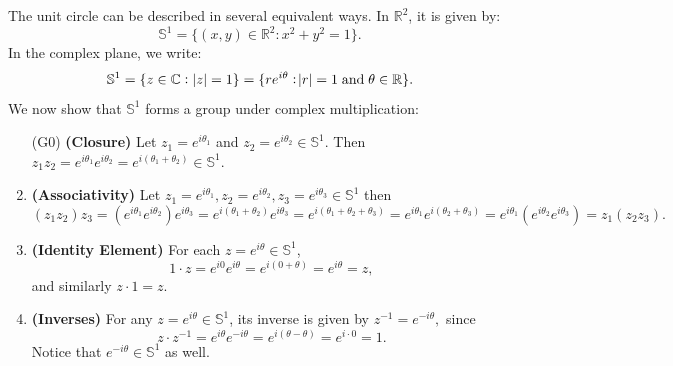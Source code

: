 \documentclass[11pt,openany]{article}
\renewcommand{\Re}{\operatorname*{Re}}
\renewcommand{\Im}{\operatorname*{Im}}
\begin{document}
\begin{center}
\end{center}
The unit circle can be described in several equivalent ways. In \(\mathbb{R}^2\), it is given by:
\[
\mathbb{S}^1 = \{ (x,y) \in \mathbb{R}^2 : x^2 + y^2 = 1 \}.
\]
In the complex plane, we write:
\[
\mathbb{S}^1 = \{ z \in \mathbb{C} : |z| = 1 \} = \{ re^{i\theta} : \abs{r}=1\;\text{and}\;\theta \in \mathbb{R} \}.
\]
We now show that \(\mathbb{S}^1\) forms a group under complex multiplication: \begin{enumerate}[(G1)]
	\item[(G0)] \textbf{(Closure)}\; Let $z_1 = e^{i\theta_1}$ and $z_2 = e^{i\theta_2} \in \mathbb{S}^1.$
	Then $z_1z_2 = e^{i\theta_1}e^{i\theta_2} = e^{i(\theta_1+\theta_2)}\in\mathbb{S}^1.$
	\item \textbf{(Associativity)}\; Let \(z_1=e^{i\theta_1}, z_2=e^{i\theta_2}, z_3=e^{i\theta_3} \in \mathbb{S}^1\) then \[
	(z_1z_2)z_3 = (e^{i\theta_1}e^{i\theta_2})e^{i\theta_3} = e^{i(\theta_1+\theta_2)}e^{i\theta_3} = e^{i(\theta_1+\theta_2+\theta_3)}=e^{i\theta_1}e^{i(\theta_2+\theta_3)}=e^{i\theta_1}(e^{i\theta_2}e^{i\theta_3})= z_1(z_2z_3).
	\]
	\item \textbf{(Identity Element)}\; For each \(z = e^{i\theta} \in \mathbb{S}^1\),
	\[
	1 \cdot z = e^{i0}e^{i\theta} = e^{i(0+\theta)}=e^{i\theta} = z,
	\]
	and similarly \(z \cdot 1 = z\).
	\item \textbf{(Inverses)}\; For any \(z = e^{i\theta} \in \mathbb{S}^1\), its inverse is given by $
	z^{-1} = e^{-i\theta},$ since
	\[
	z \cdot z^{-1} = e^{i\theta}e^{-i\theta} = e^{i(\theta-\theta)} = e^{i\cdot 0} = 1.
	\]
	Notice that \(e^{-i\theta} \in \mathbb{S}^1\) as well.
\end{enumerate}
\end{document}
